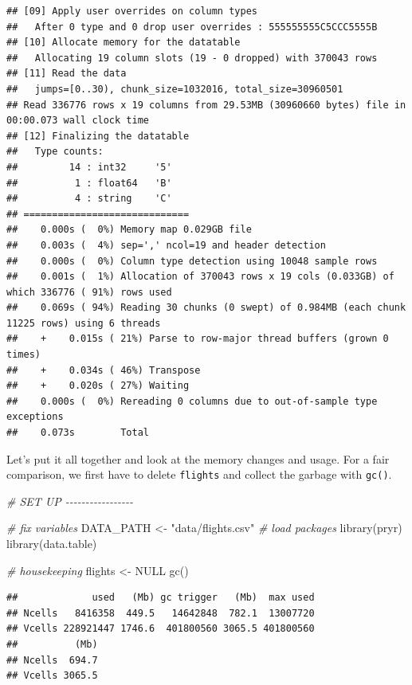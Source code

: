 \documentclass[
  12pt,
]{style/krantz}
\newenvironment{Shaded}{\begin{snugshade}}{\end{snugshade}}
\newcommand{\CommentTok}[1]{\textcolor[rgb]{0.56,0.35,0.01}{\textit{#1}}}
\newcommand{\ConstantTok}[1]{\textcolor[rgb]{0.00,0.00,0.00}{#1}}
\newcommand{\FunctionTok}[1]{\textcolor[rgb]{0.00,0.00,0.00}{#1}}
\newcommand{\NormalTok}[1]{#1}
\newcommand{\OtherTok}[1]{\textcolor[rgb]{0.56,0.35,0.01}{#1}}
\newcommand{\StringTok}[1]{\textcolor[rgb]{0.31,0.60,0.02}{#1}}
\begin{document}
\begin{verbatim}
## [09] Apply user overrides on column types
##   After 0 type and 0 drop user overrides : 555555555C5CCC5555B
## [10] Allocate memory for the datatable
##   Allocating 19 column slots (19 - 0 dropped) with 370043 rows
## [11] Read the data
##   jumps=[0..30), chunk_size=1032016, total_size=30960501
## Read 336776 rows x 19 columns from 29.53MB (30960660 bytes) file in 00:00.073 wall clock time
## [12] Finalizing the datatable
##   Type counts:
##         14 : int32     '5'
##          1 : float64   'B'
##          4 : string    'C'
## =============================
##    0.000s (  0%) Memory map 0.029GB file
##    0.003s (  4%) sep=',' ncol=19 and header detection
##    0.000s (  0%) Column type detection using 10048 sample rows
##    0.001s (  1%) Allocation of 370043 rows x 19 cols (0.033GB) of which 336776 ( 91%) rows used
##    0.069s ( 94%) Reading 30 chunks (0 swept) of 0.984MB (each chunk 11225 rows) using 6 threads
##    +    0.015s ( 21%) Parse to row-major thread buffers (grown 0 times)
##    +    0.034s ( 46%) Transpose
##    +    0.020s ( 27%) Waiting
##    0.000s (  0%) Rereading 0 columns due to out-of-sample type exceptions
##    0.073s        Total
\end{verbatim}

Let's put it all together and look at the memory changes and usage. For a fair comparison, we first have to delete \texttt{flights} and collect the garbage with \texttt{gc()}.

\begin{Shaded}
\begin{Highlighting}[]
\CommentTok{\# SET UP {-}{-}{-}{-}{-}{-}{-}{-}{-}{-}{-}{-}{-}{-}{-}{-}{-}}

\CommentTok{\# fix variables}
\NormalTok{DATA\_PATH }\OtherTok{\textless{}{-}} \StringTok{"data/flights.csv"}
\CommentTok{\# load packages}
\FunctionTok{library}\NormalTok{(pryr) }
\FunctionTok{library}\NormalTok{(data.table)}

\CommentTok{\# housekeeping}
\NormalTok{flights }\OtherTok{\textless{}{-}} \ConstantTok{NULL}
\FunctionTok{gc}\NormalTok{()}
\end{Highlighting}
\end{Shaded}

\begin{verbatim}
##             used   (Mb) gc trigger   (Mb)  max used
## Ncells   8416358  449.5   14642848  782.1  13007720
## Vcells 228921447 1746.6  401800560 3065.5 401800560
##          (Mb)
## Ncells  694.7
## Vcells 3065.5
\end{verbatim}
\end{document}
